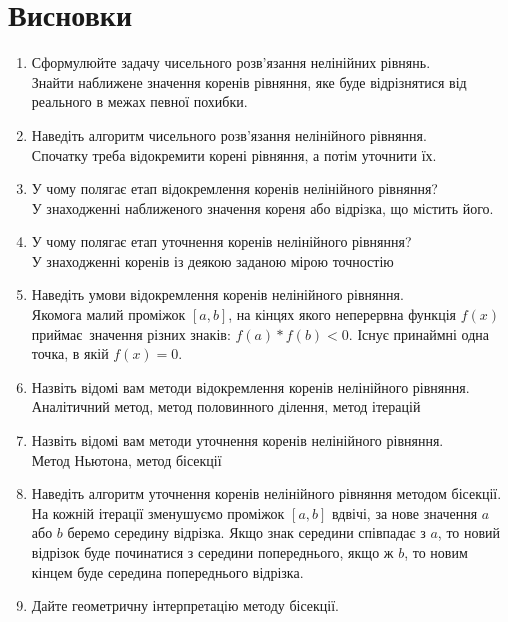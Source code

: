 \section{Висновки}
\label{sec:summary}

\begin{enumerate}
    \item Сформулюйте задачу чисельного розв’язання нелінійних рівнянь. \\
          Знайти наближене значення коренів рівняння,
          яке буде відрізнятися від реального в межах певної похибки.
    \item Наведіть алгоритм чисельного розв’язання нелінійного рівняння. \\
          Спочатку треба відокремити корені рівняння, а потім уточнити їх.
    \item У чому полягає етап відокремлення коренів нелінійного рівняння? \\
          У знаходженні наближеного значення кореня або відрізка,
          що містить його.
    \item У чому полягає етап уточнення коренів нелінійного рівняння? \\
          У знаходженні коренів із деякою заданою мірою точностію
    \item Наведіть умови відокремлення коренів нелінійного рівняння. \\
          Якомога малий проміжок $[a, b]$, на кінцях якого неперервна функція $f(x)$
          приймає значення різних знаків: $f(a) * f(b) < 0$. Існує принаймні одна точка,
          в якій $f(x) = 0$.
    \item Назвіть відомі вам методи відокремлення коренів нелінійного рівняння. \\
          Аналітичний метод, метод половинного ділення, метод ітерацій
    \item Назвіть відомі вам методи уточнення коренів нелінійного рівняння. \\
          Метод Ньютона, метод бісекції
    \item Наведіть алгоритм уточнення коренів нелінійного рівняння методом бісекції. \\
          На кожній ітерації зменушуємо проміжок $[a, b]$ вдвічі, за нове значення
          $a$ або $b$ беремо середину відрізка. Якщо знак середини співпадає з $a$,
          то новий відрізок буде починатися з середини попереднього, якщо ж $b$,
          то новим кінцем буде середина попереднього відрізка.
    \item Дайте геометричну інтерпретацію методу бісекції. \\

\end{enumerate}
